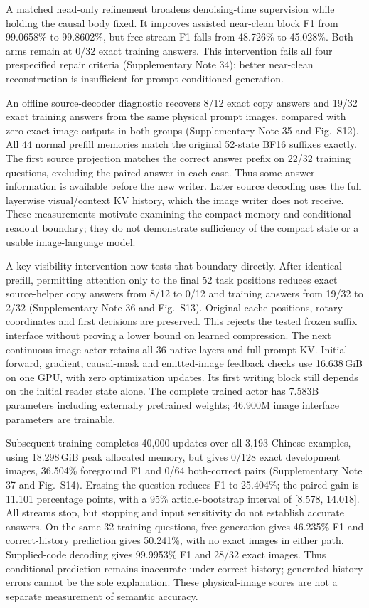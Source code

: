 \documentclass[12pt,a4paper]{article}
\begin{document}
A matched head-only refinement broadens denoising-time supervision while
holding the causal body fixed. It improves assisted near-clean block F1 from
99.0658\% to 99.8602\%, but free-stream F1 falls from 48.726\% to 45.028\%.
Both arms remain at 0/32 exact training answers. This intervention fails
all four prespecified repair criteria (Supplementary Note 34); better
near-clean reconstruction is insufficient for prompt-conditioned generation.

An offline source-decoder diagnostic recovers 8/12 exact copy answers and
19/32 exact training answers from the same physical prompt images, compared
with zero exact image outputs in both groups (Supplementary Note 35 and
Fig.~S12). All 44 normal prefill memories match the original 52-state BF16
suffixes exactly. The first source projection matches the correct answer
prefix on 22/32 training questions, excluding the paired answer in each case.
Thus some answer information is available before the new writer. Later
source decoding uses the full layerwise visual/context KV history, which
the image writer does not receive. These measurements motivate examining
the compact-memory and conditional-readout boundary; they do not demonstrate
sufficiency of the compact state or a usable image-language model.

A key-visibility intervention now tests that boundary directly. After identical
prefill, permitting attention only to the final 52 task positions reduces exact
source-helper copy answers from 8/12 to 0/12 and training answers from 19/32 to
2/32 (Supplementary Note 36 and Fig.~S13). Original cache positions, rotary
coordinates and first decisions are preserved. This rejects the tested frozen
suffix interface without proving a lower bound on learned compression. The
next continuous image actor retains all 36 native layers and full prompt KV.
Initial forward, gradient, causal-mask and emitted-image feedback checks use
16.638\,GiB on one GPU, with zero optimization updates. Its first writing block
still depends on the initial reader state alone. The complete trained actor
has 7.583B parameters including externally pretrained weights; 46.900M image
interface parameters are trainable.

Subsequent training completes 40,000 updates over all 3,193 Chinese examples,
using 18.298\,GiB peak allocated memory, but gives 0/128 exact development
images, 36.504\% foreground F1 and 0/64 both-correct pairs (Supplementary
Note 37 and Fig.~S14). Erasing the question reduces F1 to 25.404\%; the paired
gain is 11.101 percentage points, with a 95\% article-bootstrap interval of
[8.578, 14.018]. All streams stop, but stopping and input sensitivity do not
establish accurate answers. On the same 32 training questions, free generation
gives 46.235\% F1 and correct-history prediction gives 50.241\%, with no exact
images in either path. Supplied-code decoding gives 99.9953\% F1 and 28/32
exact images. Thus conditional prediction remains inaccurate under correct
history; generated-history errors cannot be the sole explanation. These
physical-image scores are not a separate measurement of semantic accuracy.
\end{document}
